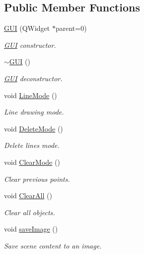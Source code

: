 \subsection*{Public Member Functions}
\begin{DoxyCompactItemize}
\item 
\mbox{\hyperlink{classGUI_acb0ba8c6fc121d814d30560e2c29f2fe}{G\+UI}} (Q\+Widget $\ast$parent=0)
\begin{DoxyCompactList}\small\item\em \mbox{\hyperlink{classGUI}{G\+UI}} constructor. \end{DoxyCompactList}\item 
\mbox{\hyperlink{classGUI_ac9cae2328dcb5d83bdfaeca49a2eb695}{$\sim$\+G\+UI}} ()
\begin{DoxyCompactList}\small\item\em \mbox{\hyperlink{classGUI}{G\+UI}} deconstructor. \end{DoxyCompactList}\item 
void \mbox{\hyperlink{classGUI_a91fab5d31617ad5631d17dfceb5a0fad}{Line\+Mode}} ()
\begin{DoxyCompactList}\small\item\em Line drawing mode. \end{DoxyCompactList}\item 
void \mbox{\hyperlink{classGUI_aac66154aaa763aac4d20e55cbd1bdc0d}{Delete\+Mode}} ()
\begin{DoxyCompactList}\small\item\em Delete lines mode. \end{DoxyCompactList}\item 
void \mbox{\hyperlink{classGUI_afb6e169c9372800e69c70a3889420325}{Clear\+Mode}} ()
\begin{DoxyCompactList}\small\item\em Clear previous points. \end{DoxyCompactList}\item 
void \mbox{\hyperlink{classGUI_a19c82a62a2b41460c81317fa967e3a1e}{Clear\+All}} ()
\begin{DoxyCompactList}\small\item\em Clear all objects. \end{DoxyCompactList}\item 
void \mbox{\hyperlink{classGUI_a44684af7706c021022520e2c4829c3ee}{save\+Image}} ()
\begin{DoxyCompactList}\small\item\em Save scene content to an image. \end{DoxyCompactList}\item 

\end{DoxyCompactItemize}
